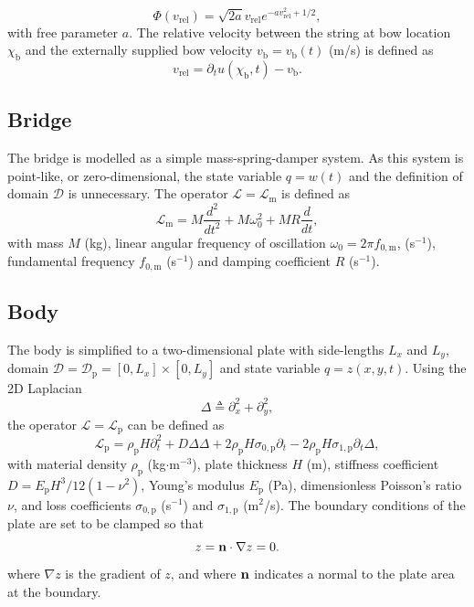 \documentclass[dvipsnames, pdftex]{article}
\def\stringx{\chi}
\def\us{u}
\def\up{z}
\begin{document}
\begin{equation}
    \Phi(v_\text{rel}) = \sqrt{2a}v_\text{rel}e^{-av_\text{rel}^2+1/2},
\end{equation}
with free parameter $a$. The relative velocity between the string at bow location $\stringx_\text{b}$ and the externally supplied bow velocity $v_\text{b} = v_\text{b}(t)$ (m/s) is defined as
\begin{equation}
    v_\text{rel} = \partial_t\us(\stringx_\text{b},t) - v_\text{b}.
\end{equation}

\subsection{Bridge}
The bridge is modelled as a simple mass-spring-damper system. As this system is point-like, or zero-dimensional, 
the state variable $q = w(t)$ and the definition of domain $\mathcal{D}$ is unnecessary. The operator $\mathcal{L}=\mathcal{L}_\text{m}$ is defined as
\begin{equation}
    \mathcal{L}_\text{m}=M\frac{d^2}{dt^2}+M\omega_0^2+MR\frac{d}{dt},
\end{equation}
with mass $M$ (kg), linear angular frequency of oscillation $\omega_0=2\pi f_{0,\text{m}}$,  (s$^{-1}$), fundamental frequency $f_{0,\text{m}}$ (s$^{-1}$) and damping coefficient $R$ (s$^{-1}$).

\subsection{Body}
The body is simplified to a two-dimensional plate with side-lengths $L_x$ and $L_y$, domain $\mathcal{D} = \mathcal{D}_\text{p} = [0,L_x] \times [0,L_y]$ and state variable $q = \up(x,y,t)$. Using the 2D Laplacian
\begin{equation}\label{eq:laplacian}
    \Delta \triangleq \partial_x^2+\partial_y^2,
\end{equation}
the operator $\mathcal{L} = \mathcal{L}_\text{p}$ can be defined as
\begin{equation}
    \mathcal{L}_\text{p} = \rho_\text{p}H\partial_t^2 + D\Delta\Delta +2\rho_\text{p}H\sigma_{0,\text{p}}\partial_t-2\rho_\text{p}H\sigma_{1,\text{p}}\partial_t\Delta,
\end{equation}
with material density $\rho_\text{p}$ (kg$\cdot$m$^{-3}$), plate thickness $H$ (m), stiffness coefficient $D = E_\text{p}H^3/12(1-\nu^2)$, Young's modulus $E_\text{p}$ (Pa), dimensionless Poisson's ratio $\nu$, and loss coefficients $\sigma_{0,\text{p}}$ (s$^{-1}$) and $\sigma_{1,\text{p}}$ (m$^2$/s). The boundary conditions of the plate are set to be clamped so that
\begin{equation}
    \up = {\bf n} \cdot \nabla \up = 0.
\end{equation}
where $\nabla \up$ is the gradient of $\up$, and where ${\bf n}$ indicates a normal to the plate area at the boundary.
\end{document}
